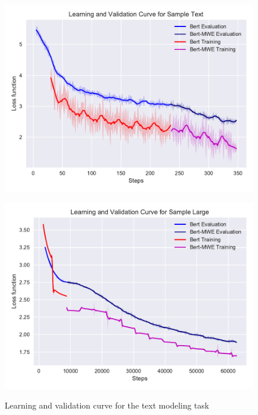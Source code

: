 \begin{figure}
\begin{minipage}[b]{.5\linewidth}
 \includegraphics[width=\linewidth]{fig/st.pdf}
\label{fig:manual-eval1}
\end{minipage}
\begin{minipage}[b]{.5\linewidth}
 \includegraphics[width=\linewidth]{fig/sl.pdf}
\label{fig:manual-eval2}
\end{minipage}
\vspace{-15pt}
\caption{Learning and validation curve for the text modeling task}
\label{fig:learning-curve}
\end{figure}





